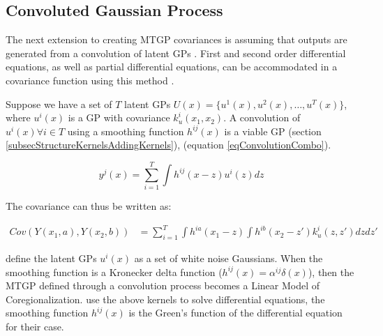 \subsection{Convoluted Gaussian Process}\label{subsecConvolutedGP}
The next extension to creating MTGP covariances is assuming that outputs are generated from a convolution of latent GPs \cite{higdon2002space, Boyle05dependentgaussian}. First and second order
differential equations, as well as partial differential equations, can be accommodated in a covariance function using this method \cite{journals/jmlr/AlvarezLL09}.

Suppose we have a set of $T$ latent GPs $U(x) = \{u^{1}(x), u^2(x), \ldots, u^{T}(x)\}$, where $u^{i}(x)$ is a GP with covariance $k_{u}^{i}(x_{1}, x_{2})$. A convolution of $u^{i}(x) \forall i \in T$ using a smoothing function $h^{ij}(x)$ is a viable GP (section \ref{subsecStructureKernelsAddingKernels}), (equation \ref{eqConvolutionCombo}).

\begin{equation}\label{eqConvolutionCombo}
y^{j}(x) = \sum_{i=1}^{T} \int h^{ij}(x - z) u^{i}(z) dz
\end{equation}

The covariance can thus be written as:

\begin{equation} \label{eqConvolutionCovariance}
 \begin{aligned}
Cov(Y(x_{1}, a), Y(x_{2}, b)) & = \sum_{i=1}^{T} \int h^{ia}(x_{1} - z) \int h^{ib}(x_{2} - z') k_{u}^{i}(z, z') dz dz'
 \end{aligned}
\end{equation}

\cite{Boyle05dependentgaussian} define the latent GPs $u^{i}(x)$ as a set of white noise Gaussians. When the smoothing function is a Kronecker delta function ($h^{ij}(x) = \alpha^{ij}\delta(x)$), then the MTGP defined through a convolution process becomes a Linear Model of Coregionalization. \cite{journals/jmlr/AlvarezLL09} use the above kernels to solve differential equations, the smoothing function $h^{ij}(x)$ is the Green's function of the differential equation for their case.  

